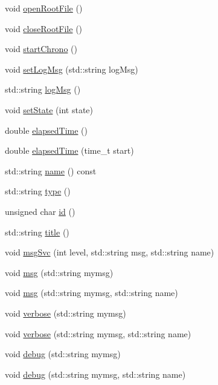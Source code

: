 \begin{DoxyCompactItemize}
\item 
void \hyperlink{classProcessus_aacf6812880c1d1a2bf14a4a39458f443}{openRootFile} ()
\item 
void \hyperlink{classProcessus_a2f3c41e99da4c738ea3d8f7b0d20a665}{closeRootFile} ()
\item 
void \hyperlink{classProcessus_a5e4d34b86241fa0756e07375a14ff4b2}{startChrono} ()
\item 
void \hyperlink{classProcessus_a471833f89047aa9a7ff6200a31c17a1d}{setLogMsg} (std::string logMsg)
\item 
std::string \hyperlink{classProcessus_a42fdeb17dc13ba854222666b6aa29b61}{logMsg} ()
\item 
void \hyperlink{classProcessus_ad38cde0f1bcefa00b068e7947b8af927}{setState} (int state)
\item 
double \hyperlink{classProcessus_aecca96218c65bc805c988cd95447df55}{elapsedTime} ()
\item 
double \hyperlink{classProcessus_a06d3815ad56593dfd0d3c1f534f8b146}{elapsedTime} (time\_\-t start)
\item 
std::string \hyperlink{classObject_a975e888d50bfcbffda2c86368332a5cd}{name} () const 
\item 
std::string \hyperlink{classObject_a84f99f70f144a83e1582d1d0f84e4e62}{type} ()
\item 
unsigned char \hyperlink{classObject_af99145335cc61ff6e2798ea17db009d2}{id} ()
\item 
std::string \hyperlink{classObject_a73a0f1a41828fdd8303dd662446fb6c3}{title} ()
\item 
void \hyperlink{classObject_a3f9d5537ebce0c0f2bf6ae4d92426f3c}{msgSvc} (int level, std::string msg, std::string name)
\item 
void \hyperlink{classObject_a58b2d0618c2d08cf2383012611528d97}{msg} (std::string mymsg)
\item 
void \hyperlink{classObject_ac5d59299273cee27aacf7de00d2e7034}{msg} (std::string mymsg, std::string name)
\item 
void \hyperlink{classObject_a83d2db2df682907ea1115ad721c1c4a1}{verbose} (std::string mymsg)
\item 
void \hyperlink{classObject_a2d4120195317e2a3c6532e8bb9f3da68}{verbose} (std::string mymsg, std::string name)
\item 
void \hyperlink{classObject_aac010553f022165573714b7014a15f0d}{debug} (std::string mymsg)
\item 
void \hyperlink{classObject_a6c9a0397ca804e04d675ed05683f5420}{debug} (std::string mymsg, std::string name)

\end{DoxyCompactItemize}
